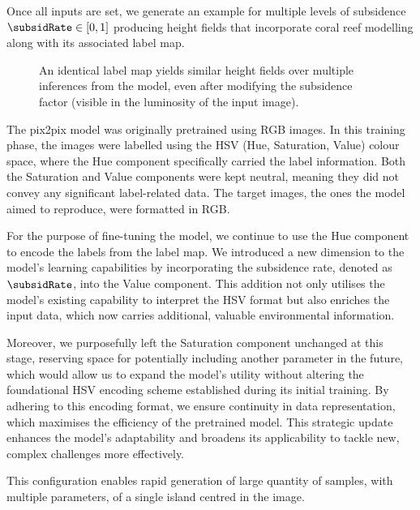 Once all inputs are set, we generate an example for multiple levels of subsidence $\subsidRate \in [0, 1]$ producing height fields that incorporate coral reef modelling along with its associated label map.

\begin{figure}
    \caption{An identical label map yields similar height fields over multiple inferences from the model, even after modifying the subsidence factor (visible in the luminosity of the input image).}
    \label{fig:coral-island-results-subsidence}
\end{figure}

The pix2pix model was originally pretrained using RGB images. In this training phase, the images were labelled using the HSV (Hue, Saturation, Value) colour space, where the Hue component specifically carried the label information. Both the Saturation and Value components were kept neutral, meaning they did not convey any significant label-related data. The target images, the ones the model aimed to reproduce, were formatted in RGB.

For the purpose of fine-tuning the model, we continue to use the Hue component to encode the labels from the label map. We introduced a new dimension to the model's learning capabilities by incorporating the subsidence rate, denoted as $\subsidRate$, into the Value component. This addition not only utilises the model's existing capability to interpret the HSV format but also enriches the input data, which now carries additional, valuable environmental information.

Moreover, we purposefully left the Saturation component unchanged at this stage, reserving space for potentially including another parameter in the future, which would allow us to expand the model's utility without altering the foundational HSV encoding scheme established during its initial training. By adhering to this encoding format, we ensure continuity in data representation, which maximises the efficiency of the pretrained model. This strategic update enhances the model's adaptability and broadens its applicability to tackle new, complex challenges more effectively.

This configuration enables rapid generation of large quantity of samples, with multiple parameters, of a single island centred in the image.

